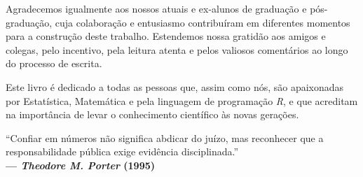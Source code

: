 \begin{refsection}
Agradecemos igualmente aos nossos atuais e ex-alunos de graduação e pós-graduação,
cuja colaboração e entusiasmo contribuíram em diferentes momentos para a construção
deste trabalho. Estendemos nossa gratidão aos amigos e colegas, pelo incentivo,
pela leitura atenta e pelos valiosos comentários ao longo do processo de escrita.
\vskip0.3cm

Este livro é dedicado a todas as pessoas que, assim como nós, são apaixonadas por
Estatística, Matemática e pela linguagem de programação \textit{R}, e que acreditam
na importância de levar o conhecimento científico às novas gerações.

\printbibliography[heading=subbibliography]

\end{refsection}


\thispagestyle{empty}

\vspace*{6cm}

\begin{flushright}
``Confiar em números não significa abdicar do juízo, 
mas reconhecer que a responsabilidade pública exige 
evidência disciplinada.'' \\[0.3cm]

\textbf{--- \textit{Theodore M. Porter} (1995)}
\end{flushright}

\clearpage
